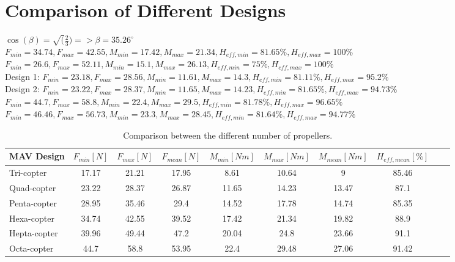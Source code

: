 \section{Comparison of Different Designs}
\label{sec:comparison}
$\cos(\beta) = \sqrt(\frac{2}{3}) =>  \beta = 35.26^{\circ} $ \\
$F_{min} = 34.74, F_{max} = 42.55 , M_{min} = 17.42,  M_{max} = 21.34,  H_{eff,min} = 81.65\%,  H_{eff,max} = 100\%$\\
$F_{min} = 26.6, F_{max} = 52.11 , M_{min} = 15.1,  M_{max} = 26.13,  H_{eff,min} = 75\%,  H_{eff,max} = 100\%$\\
Design 1: $F_{min} = 23.18, F_{max} = 28.56 , M_{min} = 11.61,  M_{max} = 14.3,  H_{eff,min} = 81.11\%,  H_{eff,max} = 95.2\%$\\
Design 2: $F_{min} = 23.22, F_{max} = 28.37 , M_{min} = 11.65,  M_{max} = 14.23,  H_{eff,min} = 81.65\%, H_{eff,max} = 94.73\%$\\
$F_{min} = 44.7, F_{max} = 58.8 , M_{min} = 22.4,  M_{max} = 29.5,  H_{eff,min} = 81.78\%,  H_{eff,max} = 96.65\%$\\
$F_{min} = 46.46, F_{max} = 56.73 , M_{min} = 23.3,  M_{max} = 28.45,  H_{eff,min} = 81.64\%, H_{eff,max} = 94.77\%$\\

\begin{table}[h]
\begin{center}
 \caption{Comparison between the different number of propellers.}\vspace{1ex}
 \label{tab:tabnefz}
 \begin{tabular}{l|ccccccccc}
 \hline
 MAV Design & $F_{min} [N]$ & $F_{max} [N]$ & $F_{mean} [N]$ & $M_{min} [Nm]$ & $M_{max} [Nm]$ & $M_{mean} [Nm]$ & $H_{eff,mean} [\%]$ \\ \hline \hline
 Tri-copter  & 17.17 & 21.21 & 17.95 & 8.61 & 10.64 & 9 & 85.46\\
 Quad-copter & 23.22 & 28.37 & 26.87 & 11.65 & 14.23 & 13.47& 87.1 \\
 Penta-copter  & 28.95 & 35.46 & 29.4 & 14.52 & 17.78 & 14.74 & 85.35\\
 Hexa-copter  & 34.74 & 42.55 & 39.52 & 17.42 & 21.34 & 19.82 & 88.9\\
 Hepta-copter  & 39.96 & 49.44 & 47.2 & 20.04 & 24.8 & 23.66 & 91.1\\
 Octa-copter  & 44.7 & 58.8 & 53.95 & 22.4 & 29.48 & 27.06 & 91.42\\
 \hline
 \end{tabular}
\end{center}
\end{table}

